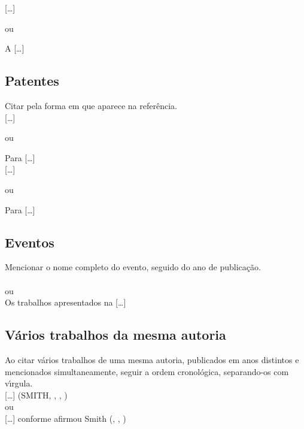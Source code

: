 [\ldots] \cite{Food2005}

ou 

A  [\ldots] \\


\subsection{Patentes}

Citar pela forma em que aparece na refer\^encia.\\

[\ldots] \cite{Bagnato2018}

ou 

Para  [\ldots] \\


[\ldots] \cite{Rocha2017}

ou 

Para  [\ldots] \\


\subsection{Eventos}

Mencionar o nome completo do evento, seguido do ano de publica\c{c}\~ao.\\

\cite{reuniao1985}\\

ou\\

Os trabalhos apresentados na  [\ldots]\\

\subsection{V\'arios trabalhos da mesma autoria}

Ao citar v\'arios trabalhos de uma mesma autoria, publicados em anos distintos e mencionados simultaneamente, seguir a ordem cronol\'ogica, separando-os com v\'{\i}rgula.\\

[\ldots] (SMITH, \citeyear{Smith1990}, \citeyear{Smith1999}, \citeyear{Smith2002}) \\

ou\\

[\ldots] conforme afirmou Smith (\citeyear{Smith1990}, \citeyear{Smith1999}, \citeyear{Smith2002})\\


